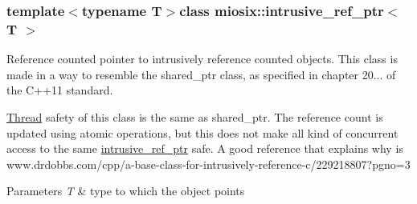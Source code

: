 \subsubsection*{template$<$typename T$>$class miosix\-::intrusive\-\_\-ref\-\_\-ptr$<$ T $>$}

Reference counted pointer to intrusively reference counted objects. This class is made in a way to resemble the shared\-\_\-ptr class, as specified in chapter 20... of the C++11 standard.

\hyperlink{classmiosix_1_1_thread}{Thread} safety of this class is the same as shared\-\_\-ptr. The reference count is updated using atomic operations, but this does not make all kind of concurrent access to the same \hyperlink{classmiosix_1_1intrusive__ref__ptr}{intrusive\-\_\-ref\-\_\-ptr} safe. A good reference that explains why is www.\-drdobbs.\-com/cpp/a-\/base-\/class-\/for-\/intrusively-\/reference-\/c/229218807?pgno=3


\begin{DoxyParams}{Parameters}
{\em T} & type to which the object points \\
\hline
\end{DoxyParams}


